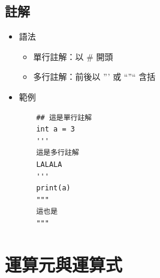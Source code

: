 \documentclass[a4paper,12pt]{article}
\begin{document}
\subsection{註解}
\label{sec:orgf254771}
\begin{itemize}
\item 語法\\
\begin{itemize}
\item 單行註解：以 \# 開頭\\
\item 多行註解：前後以  '''  或  ``''``  含括\\
\end{itemize}
\item 範例\\
\lstset{breaklines=true,language=Python,label= ,caption= ,captionpos=b,firstnumber=1,numbers=left}
\begin{lstlisting}
    ## 這是單行註解
    int a = 3
    '''
    這是多行註解
    LALALA
    '''
    print(a)
    """
    這也是
    """
\end{lstlisting}
\end{itemize}

\newpage

\section{運算元與運算式}
\label{py-operation}
\end{document}

